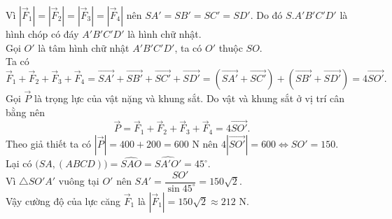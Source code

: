 \begin{ex}
{ Vì $\left|\overrightarrow{F}_1\right| = \left|\overrightarrow{F}_2\right| = \left|\overrightarrow{F}_3\right| = \left|\overrightarrow{F}_4\right|$ nên $SA'=SB'=SC'=SD'$. Do đó $S.A'B'C'D'$ là hình chóp có đáy $A'B'C'D'$ là hình chữ nhật.\\
 Gọi $O'$ là tâm hình chữ nhật $A'B'C'D'$, ta có $O'$ thuộc $SO$.\\
 Ta có
 \[\overrightarrow{F}_1 + \overrightarrow{F}_2 + \overrightarrow{F}_3 + \overrightarrow{F}_4 = \overrightarrow{SA'} + \overrightarrow{SB'} + \overrightarrow{SC'} + \overrightarrow{SD'} = \left(\overrightarrow{SA'} + \overrightarrow{SC'}\right) + \left(\overrightarrow{SB'} + \overrightarrow{SD'}\right) =4\overrightarrow{SO'}.\]
 Gọi $\overrightarrow{P}$ là trọng lực của vật nặng và khung sắt. Do vật và khung sắt ở vị trí cân bằng nên
 \[\overrightarrow{P} = \overrightarrow{F}_1 + \overrightarrow{F}_2 + \overrightarrow{F}_3 + \overrightarrow{F}_4 = 4\overrightarrow{SO'}.\]
 Theo giả thiết ta có $\left|\overrightarrow{P}\right|=400+200=600$ N nên $4\left|\overrightarrow{SO'}\right| =600 \Leftrightarrow SO'=150$.\\
 Lại có $\bigl(SA,(ABCD)\bigr)=\widehat{SAO}=\widehat{SA'O'}=45^\circ$.\\
 Vì $\triangle SO'A'$ vuông tại $O'$ nên $SA'=\dfrac{SO'}{\sin 45^{\circ}}=150\sqrt{2}$.\\
 Vậy cường độ của lực căng $\overrightarrow{F}_1$ là $\left|\overrightarrow{F}_1\right| = 150\sqrt{2}\approx 212$ N.
 }
\end{ex}


 

